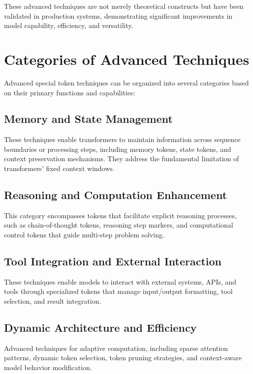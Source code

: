 These advanced techniques are not merely theoretical constructs but have been validated in production systems, demonstrating significant improvements in model capability, efficiency, and versatility.

\section{Categories of Advanced Techniques}

Advanced special token techniques can be organized into several categories based on their primary functions and capabilities:

\subsection{Memory and State Management}

These techniques enable transformers to maintain information across sequence boundaries or processing steps, including memory tokens, state tokens, and context preservation mechanisms. They address the fundamental limitation of transformers' fixed context windows.

\subsection{Reasoning and Computation Enhancement}

This category encompasses tokens that facilitate explicit reasoning processes, such as chain-of-thought tokens, reasoning step markers, and computational control tokens that guide multi-step problem solving.

\subsection{Tool Integration and External Interaction}

These techniques enable models to interact with external systems, APIs, and tools through specialized tokens that manage input/output formatting, tool selection, and result integration.

\subsection{Dynamic Architecture and Efficiency}

Advanced techniques for adaptive computation, including sparse attention patterns, dynamic token selection, token pruning strategies, and context-aware model behavior modification.

